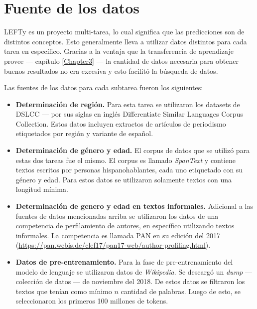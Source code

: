 \section{Fuente de los datos}

LEFTy es un proyecto multi-tarea, lo cual significa que las predicciones son de distintos conceptos. Esto generalmente lleva a utilizar datos distintos para cada tarea en específico. Gracias a la ventaja que la transferencia de aprendizaje provee --- capítulo \ref{Chapter3} --- la cantidad de datos necesaria para obtener buenos resultados no era excesiva y esto facilitó la búsqueda de datos.

Las fuentes de los datos para cada subtarea fueron los siguientes:

\begin{itemize}
\item \textbf{Determinación de región.} Para esta tarea se utilizaron los datasets de DSLCC \parencite{tan:2014:BUCC} --- por sus siglas en inglés Differentiate Similar Languages Corpus Collection. Estos datos incluyen extractos de artículos de periodismo etiquetados por región y variante de español.

\item \textbf{Determinación de género y edad.} El corpus de datos que se utilizó para estas dos tareas fue el mismo. El corpus es llamado \textit{SpanText} \parencite{villegas:2014:CACIC} y contiene textos escritos por personas hispanohablantes, cada uno etiquetado con su género y edad. Para estos datos se utilizaron solamente textos con una longitud mínima.

\item \textbf{Determinación de genero y edad en textos informales.} Adicional a las fuentes de datos mencionadas arriba se utilizaron los datos de una competencia de perfilamiento de autores, en específico utilizando textos informales. La competencia es llamada PAN en su edición del 2017 (\url{https://pan.webis.de/clef17/pan17-web/author-profiling.html}).

\item \textbf{Datos de pre-entrenamiento.} Para la fase de pre-entrenamiento del modelo de lenguaje se utilizaron datos de \textit{Wikipedia}. Se descargó un \textit{dump} --- colección de datos --- de noviembre del 2018. De estos datos se filtraron los textos que tenían como mínimo $n$ cantidad de palabras. Luego de esto, se seleccionaron los primeros 100 millones de tokens.
\end{itemize}

\begin{comment}
seguir aca con detalles de datos si es necesario
\end{comment}



